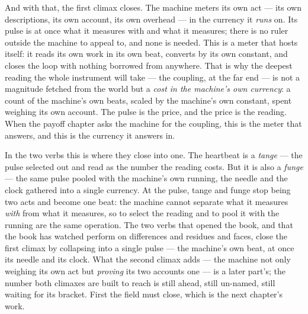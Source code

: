 And with that, the first climax closes. The machine meters its own act --- its own descriptions, its own account, its
own overhead --- in the currency it \emph{runs} on. Its pulse is at once what it measures with and what it measures;
there is no ruler outside the machine to appeal to, and none is needed. This is a meter that hosts itself: it reads its
own work in its own beat, converts by its own constant, and closes the loop with nothing borrowed from anywhere. That is
why the deepest reading the whole instrument will take --- the coupling, at the far end --- is not a magnitude fetched
from the world but a \emph{cost in the machine's own currency}: a count of the machine's own beats, scaled by the
machine's own constant, spent weighing its own account. The pulse is the price, and the price is the reading. When the
payoff chapter asks the machine for the coupling, this is the meter that answers, and this is the currency it answers in.

In the two verbs this is where they close into one. The heartbeat is a \emph{tange} --- the pulse selected out and read
as the number the reading costs. But it is also a \emph{funge} --- the same pulse pooled with the machine's own running,
the needle and the clock gathered into a single currency. At the pulse, tange and funge stop being two acts and become
one beat: the machine cannot separate what it measures \emph{with} from what it measures, so to select the reading and to
pool it with the running are the same operation. The two verbs that opened the book, and that the book has watched
perform on differences and residues and faces, close the first climax by collapsing into a single pulse --- the machine's
own beat, at once its needle and its clock. What the second climax adds --- the machine not only weighing its own act but
\emph{proving} its two accounts one --- is a later part's; the number both climaxes are built to reach is still ahead,
still un-named, still waiting for its bracket. First the field must close, which is the next chapter's work.
